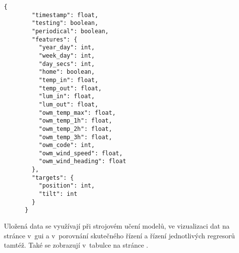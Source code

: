     \begin{lstlisting}[caption={[Struktura vzorku v~databázi]Struktura vzorku dat uloženého jako záznam v~databázi MongoDB. Obsahuje hodnoty příznaků i stav žaluzií v~okamžiku jeho pořízení a časovou známku. Místo hodnot jsou zde uvedeny jejich datové typy (\code{float} - číslo s plovoucí řádovou čárkou, \code{boolean} - pravdivostní hodnota, \code{int} - celé číslo)},captionpos=b,label=lst:datum]
      {
        "timestamp": float,
        "testing": boolean,   
        "periodical": boolean,
        "features": {
          "year_day": int,
          "week_day": int,
          "day_secs": int,
          "home": boolean,
          "temp_in": float,
          "temp_out": float,
          "lum_in": float,
          "lum_out": float,
          "owm_temp_max": float,
          "owm_temp_1h": float,
          "owm_temp_2h": float,
          "owm_temp_3h": float,
          "owm_code": int,
          "owm_wind_speed": float,
          "owm_wind_heading": float
        },
        "targets": {
          "position": int,         
          "tilt": int
        }
      }
    \end{lstlisting}

    Uložená data se využívají při strojovém učení modelů, ve vizualizaci dat na stránce  v~\acrshort{gui} a v~porovnání skutečného řízení a řízení jednotlivých regresorů tamtéž. Také se zobrazují v~tabulce na stránce .

